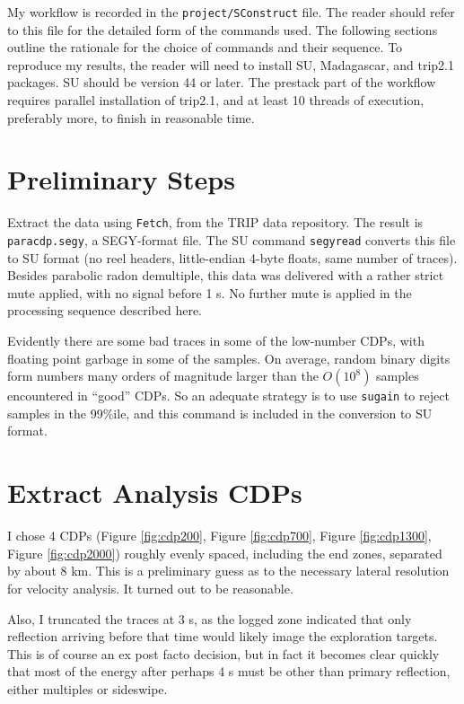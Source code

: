 My workflow is recorded in the {\tt project/SConstruct} file. The reader should refer to this file for the detailed form of the commands used. The following sections outline the rationale for the choice of commands and their sequence. To reproduce my results, the reader will need to install SU, Madagascar, and trip2.1 packages. SU should be version 44 or later. The prestack part of the workflow requires parallel installation of trip2.1, and at least 10 threads of execution, preferably more, to finish in reasonable time. 

\section{Preliminary Steps}
Extract the data using {\tt Fetch}, from the TRIP data repository. The result is {\tt paracdp.segy}, a SEGY-format file. The SU command {\tt segyread} converts this file to SU format (no reel headers, little-endian 4-byte floats, same number of traces). Besides parabolic radon demultiple, this data was delivered with a rather strict mute applied, with no signal before 1 s. No further mute is applied in the processing sequence described here. 

Evidently there are some bad traces in some of the low-number CDPs, with floating point garbage in some of the samples. On average, random binary digits form numbers many orders of magnitude larger than the $O(10^8)$ samples encountered in ``good'' CDPs. So an adequate strategy is to use {\tt sugain} to reject samples in the 99\%ile, and this command is included in the conversion to SU format.

\section{Extract Analysis CDPs}
I chose 4 CDPs (Figure \ref{fig:cdp200}, Figure \ref{fig:cdp700}, Figure \ref{fig:cdp1300}, Figure \ref{fig:cdp2000}) roughly evenly spaced, including the end zones, separated by about 8 km. This is a preliminary guess as to the necessary lateral resolution for velocity analysis. It turned out to be reasonable. 

Also, I truncated the traces at 3 s, as the logged zone indicated that only reflection arriving before that time would likely image the exploration targets. This is of course an ex post facto decision, but in fact it becomes clear quickly that most of the energy after perhaps 4 s must be other than primary reflection, either multiples or sideswipe.


